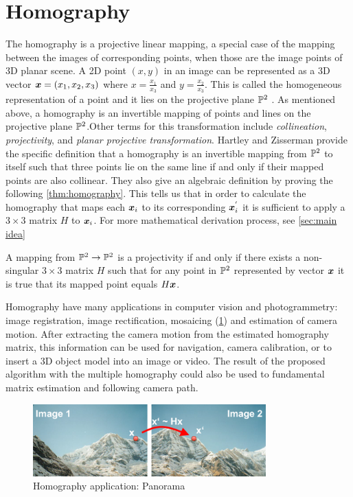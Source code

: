 \section{Homography} \label{sec: Multiple Homography}
The homography is a projective linear mapping, a special case of the mapping between the images of corresponding points, when those are the image points of 3D planar scene. A 2D point $\left( x, y \right)$ in an image can be represented as a 3D vector $ \boldsymbol{x} = \left( x_{1}, x_{2}, x_{3}\right)$ where $ x = \frac{x_{1}}{x_{3}} $ and $ y = \frac{x_{2}}{x_{3}} $. This is called the homogeneous representation of a point and it lies on the projective plane $ \mathbb{P}^{2} $ \cite{szeliskiComputerVisionAlgorithms}.  As mentioned above,  a homography is an invertible mapping of points and lines on the projective plane $ \mathbb{P}^{2} $.Other terms for this transformation include \textit{collineation}, \textit{projectivity}, and \textit{planar projective transformation}. Hartley and Zisserman \cite{hartleyMultipleViewGeometry2004} provide the specific definition that a homography is an invertible mapping from $ \mathbb{P}^{2} $ to itself such that three points lie on the same line if and only if their mapped points are also collinear. They also give an algebraic definition by proving the following \cref{thm:homography}. This tells us that in order to calculate the homography that maps each $ \boldsymbol{x}_{i} $ to its corresponding $ \boldsymbol{x}_{i}^{'} $ it is sufficient to apply a  $ 3 \times 3 $  matrix $ H $ to $\boldsymbol{x}_{i}$. For more mathematical derivation process, see \cref{sec:main idea}
\begin{theorem}[Homography]\label{thm:homography}
	A mapping from $\mathbb{P}^{2}\rightarrow\mathbb{P}^{2}$ is a projectivity if and only if there exists a non-singular $3\times3$ matrix $H$ such that for any point in $\mathbb{P}^{2}$ represented by vector $\boldsymbol{x}$ it is true that its mapped point equals $H\boldsymbol{x}$.
\end{theorem}

Homography have many applications in computer vision and photogrammetry: image registration, image rectification, mosaicing (\cref{fig:Homography application}) and estimation of camera motion. After extracting the camera motion from the estimated homography matrix, this information can be used for navigation, camera calibration, or to insert a 3D object model into an image or video.  The result of the proposed algorithm with the multiple homography could also be used to fundamental matrix estimation and following camera path.
\begin{figure}[htbp]
	\centering
	\includegraphics[width=0.80\textwidth]{images/homography_application}
	\caption{Homography application: Panorama \cite{stricker2DProjectiveTransformations2020}}
	\label{fig:Homography application}
\end{figure}

